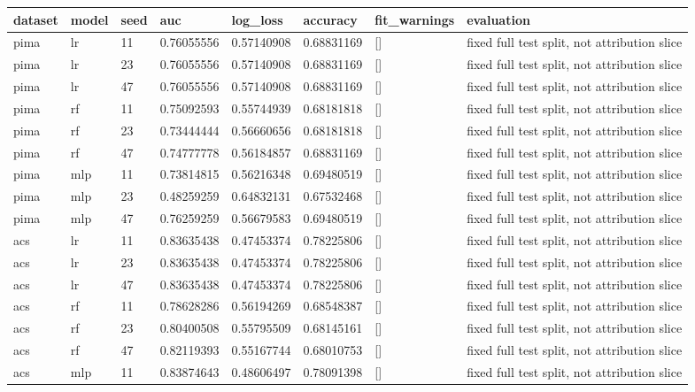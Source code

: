 \begin{tabular}{llllllll}
\toprule
dataset & model & seed & auc & log\_loss & accuracy & fit\_warnings & evaluation \\
\midrule
pima & lr & 11 & 0.76055556 & 0.57140908 & 0.68831169 & [] & fixed full test split, not attribution slice \\
pima & lr & 23 & 0.76055556 & 0.57140908 & 0.68831169 & [] & fixed full test split, not attribution slice \\
pima & lr & 47 & 0.76055556 & 0.57140908 & 0.68831169 & [] & fixed full test split, not attribution slice \\
pima & rf & 11 & 0.75092593 & 0.55744939 & 0.68181818 & [] & fixed full test split, not attribution slice \\
pima & rf & 23 & 0.73444444 & 0.56660656 & 0.68181818 & [] & fixed full test split, not attribution slice \\
pima & rf & 47 & 0.74777778 & 0.56184857 & 0.68831169 & [] & fixed full test split, not attribution slice \\
pima & mlp & 11 & 0.73814815 & 0.56216348 & 0.69480519 & [] & fixed full test split, not attribution slice \\
pima & mlp & 23 & 0.48259259 & 0.64832131 & 0.67532468 & [] & fixed full test split, not attribution slice \\
pima & mlp & 47 & 0.76259259 & 0.56679583 & 0.69480519 & [] & fixed full test split, not attribution slice \\
acs & lr & 11 & 0.83635438 & 0.47453374 & 0.78225806 & [] & fixed full test split, not attribution slice \\
acs & lr & 23 & 0.83635438 & 0.47453374 & 0.78225806 & [] & fixed full test split, not attribution slice \\
acs & lr & 47 & 0.83635438 & 0.47453374 & 0.78225806 & [] & fixed full test split, not attribution slice \\
acs & rf & 11 & 0.78628286 & 0.56194269 & 0.68548387 & [] & fixed full test split, not attribution slice \\
acs & rf & 23 & 0.80400508 & 0.55795509 & 0.68145161 & [] & fixed full test split, not attribution slice \\
acs & rf & 47 & 0.82119393 & 0.55167744 & 0.68010753 & [] & fixed full test split, not attribution slice \\
acs & mlp & 11 & 0.83874643 & 0.48606497 & 0.78091398 & [] & fixed full test split, not attribution slice \\

\end{tabular}
